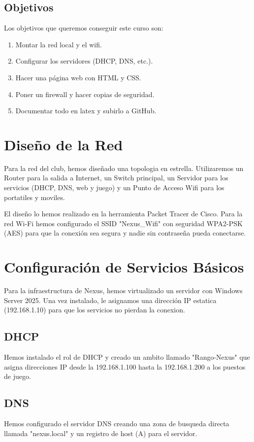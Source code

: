 \documentclass{article}
\begin{document}
\subsection{Objetivos}
Los objetivos que queremos conseguir este curso son:
\begin{enumerate}
    \item Montar la red local y el wifi.
    \item Configurar los servidores (DHCP, DNS, etc.).
    \item Hacer una página web con HTML y CSS.
    \item Poner un firewall y hacer copias de seguridad.
    \item Documentar todo en latex y subirlo a GitHub.
\end{enumerate}

\section{Diseño de la Red}

Para la red del club, hemos diseñado una topologia en estrella. 
Utilizaremos un Router para la salida a Internet, un Switch principal, un Servidor para los servicios (DHCP, DNS, web y juego) y un Punto de Acceso Wifi para los portatiles y moviles.

El diseño lo hemos realizado en la herramienta Packet Tracer de Cisco. 
Para la red Wi-Fi hemos configurado el SSID "Nexus\_Wifi" con seguridad WPA2-PSK (AES) para que la conexión sea segura y nadie sin contraseña pueda conectarse.

\section{Configuración de Servicios Básicos}

Para la infraestructura de Nexus, hemos virtualizado un servidor con Windows Server 2025. Una vez instalado, le asignamos una dirección IP estatica (192.168.1.10) para que los servicios no pierdan la conexion.

\subsection{DHCP}
Hemos instalado el rol de DHCP y creado un ambito llamado "Rango-Nexus" que asigna direcciones IP desde la 192.168.1.100 hasta la 192.168.1.200 a los puestos de juego.

\subsection{DNS}
Hemos configurado el servidor DNS creando una zona de busqueda directa llamada "nexus.local" y un registro de host (A) para el servidor.
\end{document}
